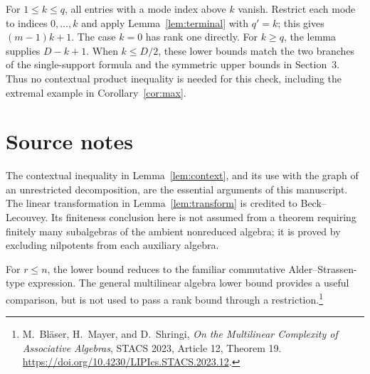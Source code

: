 \documentclass[11pt]{article}
\theoremstyle{definition}
\theoremstyle{remark}
\begin{document}
For $1\le k\le q$, all entries with a mode index above $k$ vanish. Restrict
each mode to indices $0,\ldots,k$ and apply Lemma~\ref{lem:terminal} with
$q'=k$; this gives $(m-1)k+1$. The case $k=0$ has rank one directly.
For $k\ge q$, the lemma supplies $D-k+1$. When $k\le D/2$, these lower bounds
match the two branches of the single-support formula and the symmetric upper
bounds in Section~3. Thus no contextual product inequality is needed for this
check, including the extremal example in Corollary~\ref{cor:max}.

\section{Source notes}

The contextual inequality in Lemma~\ref{lem:context}, and its use with the graph
of an unrestricted decomposition, are the essential arguments of this
manuscript. The linear transformation in Lemma~\ref{lem:transform} is credited
to Beck--Lecouvey. Its finiteness conclusion here is not assumed from a theorem
requiring finitely many subalgebras of the ambient nonreduced algebra; it is
proved by excluding nilpotents from each auxiliary algebra.

For $r\le n$, the lower bound reduces to the familiar commutative
Alder--Strassen-type expression. The general multilinear algebra lower bound
provides a useful comparison, but is not used to pass a rank bound through a
restriction.\footnote{M.~Bl\"aser, H.~Mayer, and D.~Shringi,
\emph{On the Multilinear Complexity of Associative Algebras}, STACS 2023,
Article 12, Theorem 19. \url{https://doi.org/10.4230/LIPIcs.STACS.2023.12}.}
\end{document}
